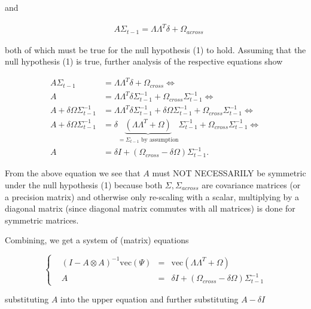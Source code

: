 \documentclass[
  letterpaper,
  DIV=11,
  numbers=noendperiod]{scrartcl}
\begin{document}
and

\[
\begin{align*}
&A\Sigma_{t-1}=\Lambda\Lambda^T\delta+\Omega_{across}
\end{align*}
\]

both of which must be true for the null hypothesis (1) to hold. Assuming
that the null hypothesis (1) is true, further analysis of the respective
equations show

\[
\begin{aligned}
A\Sigma_{t-1} &= \Lambda\Lambda^T\delta+\Omega_{cross} \Leftrightarrow\\
A &= \Lambda\Lambda^T\delta \Sigma_{t-1}^{-1} + \Omega_{cross} \Sigma_{t-1}^{-1} \Leftrightarrow\\
A + \delta \Omega \Sigma_{t-1}^{-1} &= \Lambda\Lambda^T\delta \Sigma_{t-1}^{-1} + \delta \Omega \Sigma_{t-1}^{-1} + \Omega_{cross} \Sigma_{t-1}^{-1} \Leftrightarrow\\
A + \delta \Omega \Sigma_{t-1}^{-1} &= \delta \underbrace{(\Lambda\Lambda^T + \Omega)}_{=\Sigma_{t-1} \text{ by assumption}} \Sigma_{t-1}^{-1} + \Omega_{cross} \Sigma_{t-1}^{-1} \Leftrightarrow\\
A &= \delta I + (\Omega_{cross} - \delta \Omega)\Sigma_{t-1}^{-1}.
\end{aligned}
\]

From the above equation we see that \(A\) must NOT NECESSARILY be
symmetric under the null hypothesis (1) because both
\(\Sigma,\Sigma_{across}\) are covariance matrices (or a precision
matrix) and otherwise only re-scaling with a scalar, multiplying by a
diagonal matrix (since diagonal matrix commutes with all matrices) is
done for symmetric matrices.

Combining, we get a system of (matrix) equations

\[
\begin{cases}
&(I-A \otimes A)^{-1} \text{vec}(\Psi) &=& \text{vec}(\Lambda \Lambda^T + \Omega)\\
&A &=& \delta I + (\Omega_{cross} - \delta \Omega)\Sigma_{t-1}^{-1}
\end{cases}
\]

substituting \(A\) into the upper equation and further substituting
\(A-\delta I\)
\end{document}
